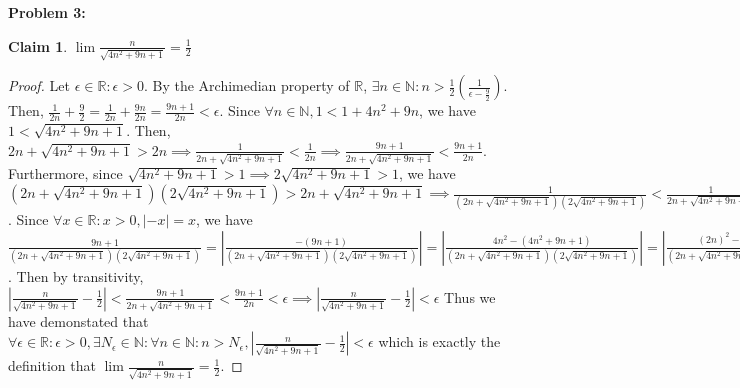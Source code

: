\documentclass{article}
\newcommand{\reals}{\ensuremath{\mathbb{R}}}
\newcommand{\nats}{\ensuremath{\mathbb{N}}}
\newcommand{\eps}{\ensuremath{\epsilon}}
\newcommand{\neps}{\ensuremath{N_\epsilon}}
\newcommand{\csn}{\sqrt{4n^2+9n+1}}
\newtheorem{clm}{Claim}
\begin{document}
\textbf{Problem 3:}

\begin{clm} \label{c3}
	$\lim \frac{n}{\csn} = \frac{1}{2}$
\end{clm}

\begin{proof}
	Let $\eps \in \reals: \eps > 0$.
	By the Archimedian property of \reals,
	$\exists n \in \nats: n > \frac{1}{2}(\frac{1}{\eps - \frac{9}{2}})$.
	Then, $\frac{1}{2n} + \frac{9}{2} = \frac{1}{2n} + \frac{9n}{2n} = \frac{9n+1}{2n}< \eps$.
	Since $\forall n \in \nats, 1 < 1 + 4n^2 + 9n$, we have $1 < \csn$.
	Then, $2n + \csn > 2n \implies \frac{1}{2n + \csn} < \frac{1}{2n}
	\implies \frac{9n+1}{2n + \csn} < \frac{9n+1}{2n} $. 
	Furthermore, since $\csn > 1 \implies 2\csn > 1$,
	we have $(2n + \csn)(2\csn) > 2n + \csn \implies \frac{1}{(2n + \csn)(2\csn)} < \frac{1}{2n + \csn}
	\implies \frac{9n+1}{(2n + \csn)(2\csn)} < \frac{9n+1}{2n + \csn}$.
	Since $\forall x \in \reals: x > 0, |-x| = x$,
	we have $\frac{9n+1}{(2n + \csn)(2\csn)} = |\frac{-(9n+1)}{(2n + \csn)(2\csn)}|
	= |\frac{4n^2 -(4n^2 +9n+1)}{(2n + \csn)(2\csn)}| = |\frac{(2n)^2 - (\csn)^2}{(2n + \csn)(2\csn)}|
	= |\frac{2n - \csn}{2\csn}| = |\frac{n}{\csn} - \frac{1}{2}|$.
	Then by transitivity, $|\frac{n}{\csn} - \frac{1}{2}| < \frac{9n+1}{2n + \csn} < \frac{9n+1}{2n} < \eps
	\implies |\frac{n}{\csn} - \frac{1}{2}| < \eps$
	Thus we have demonstated that $\forall \eps \in \reals : \eps > 0, \exists \neps \in \nats:
	\forall n \in \nats: n > \neps,
	|\frac{n}{\csn} - \frac{1}{2}| < \eps$
	which is exactly the definition that
	$\lim \frac{n}{\csn} = \frac{1}{2}$.
\end{proof}
\end{document}

